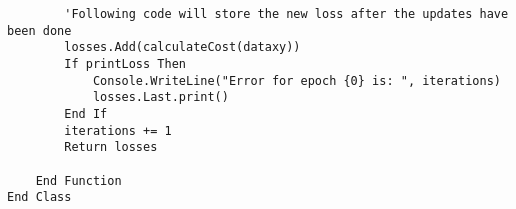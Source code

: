 \begin{verbatim}
        'Following code will store the new loss after the updates have been done
        losses.Add(calculateCost(dataxy))
        If printLoss Then
            Console.WriteLine("Error for epoch {0} is: ", iterations)
            losses.Last.print()
        End If
        iterations += 1
        Return losses

    End Function
End Class
\end{verbatim}